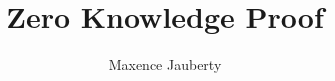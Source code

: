 \documentclass[a4paper]{article}
\begin{document}
\title{Zero Knowledge Proof }
\author{Maxence Jauberty}
\maketitle
\end{document}
